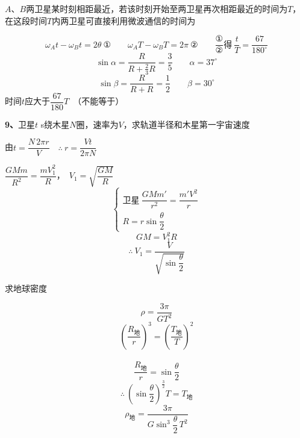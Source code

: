 \begin{problem}
$A$、$B$两卫星某时刻相距最近，若该时刻开始至两卫星再次相距最近的时间为$T$，在这段时间$T$内两卫星可直接利用微波通信的时间为%
\begin{solution}
\[ \omega_A t-\omega_B t=2\theta\ \text{①}\qquad \omega_A T-\omega_B T=2\pi\ \text{②}\qquad \dfrac{\text{①}}{\text{②}}\text{得}\ \dfrac{t}{T}=\dfrac{67}{180^\circ} \]
\[ \sin\alpha=\dfrac{R}{R+\frac{2}{3}R}=\dfrac{3}{5}\qquad \alpha=37^\circ \]
\[ \sin\beta=\dfrac{R}{R+R}=\dfrac{1}{2}\qquad \beta=30^\circ \]
时间$t$应大于$\dfrac{67}{180}T$　（不能等于）
\end{solution}
\end{problem}
\begin{problem}[9]
\textbf{9、}卫星$t$ s绕木星$N$圈，速率为$V$，求轨道半径和木星第一宇宙速度
\begin{solution}
由$t=\dfrac{N\,2\pi r}{V}$　$\therefore\ r=\dfrac{Vt}{2\pi N}$

$\dfrac{GMm}{R^2}=\dfrac{mV_1^2}{R}$，　$V_1=\sqrt{\dfrac{GM}{R}}$
\[ \begin{cases}
\text{卫星}\ \dfrac{GMm'}{r^2}=\dfrac{m'V^2}{r}\\[4pt]
R=r\sin\dfrac{\theta}{2}
\end{cases} \]
\[ GM=V_1^2R \]
\[ \therefore\ V_1=\dfrac{V}{\sqrt{\sin\dfrac{\theta}{2}}} \]
\end{solution}
\end{problem}
\begin{problem}
求地球密度
\begin{solution}
\[ \rho=\dfrac{3\pi}{GT^2} \]
\[ \left(\dfrac{R_{\text{地}}}{r}\right)^3=\left(\dfrac{T_{\text{地}}}{T}\right)^2 \]
　
\[ \dfrac{R_{\text{地}}}{r}=\sin\dfrac{\theta}{2} \]
\[ \therefore\ \left(\sin\dfrac{\theta}{2}\right)^{\frac{3}{2}}T=T_{\text{地}} \] %
\[ \rho_{\text{地}}=\dfrac{3\pi}{G\sin^{3}\dfrac{\theta}{2}\,T^2} \]
\end{solution}
\end{problem}
